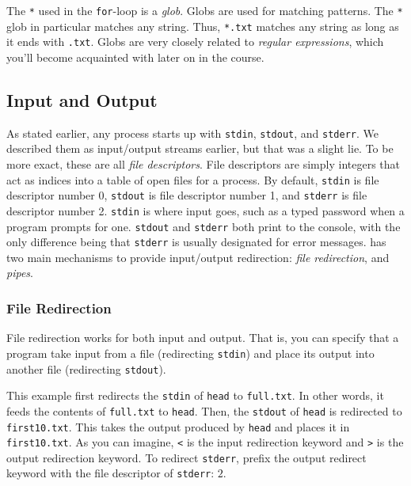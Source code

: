 The \texttt{*} used in the \texttt{for}-loop is a \emph{glob}. Globs are used
for matching patterns. The \texttt{*} glob in particular matches any string.
Thus, \texttt{*.txt} matches any string as long as it ends with \texttt{.txt}.
Globs are very closely related to \emph{regular expressions}, which you'll
become acquainted with later on in the course.

\subsection{Input and Output}

As stated earlier, any \Unix{} process starts up with \texttt{stdin},
\texttt{stdout}, and \texttt{stderr}. We described them as input/output streams
earlier, but that was a slight lie. To be more exact, these are all \emph{file
descriptors}. File descriptors are simply integers that act as indices into a
table of open files for a process. By default, \texttt{stdin} is file descriptor
number 0, \texttt{stdout} is file descriptor number 1, and \texttt{stderr} is file descriptor
number 2. \texttt{stdin} is where input goes, such as a typed password when a program
prompts for one. \texttt{stdout} and \texttt{stderr} both print to the console,
with the only difference being that \texttt{stderr} is usually designated for
error messages. \Bash{} has two main mechanisms to provide input/output
redirection: \emph{file redirection}, and \emph{pipes}.

\subsubsection{File Redirection}

File redirection works for both input and output. That is, you can specify that
a program take input from a file (redirecting \texttt{stdin}) and place its
output into another file (redirecting \texttt{stdout}).


This example first redirects the \texttt{stdin} of \texttt{head} to
\texttt{full.txt}. In other words, it feeds the contents of \texttt{full.txt} to
\texttt{head}. Then, the \texttt{stdout} of \texttt{head} is redirected to
\texttt{first10.txt}. This takes the output produced by \texttt{head} and places
it in \texttt{first10.txt}. As you can imagine, \texttt{<} is the input
redirection keyword and \texttt{>} is the output redirection keyword. To
redirect \texttt{stderr}, prefix the output redirect keyword with the file
descriptor of \texttt{stderr}: $2$.

